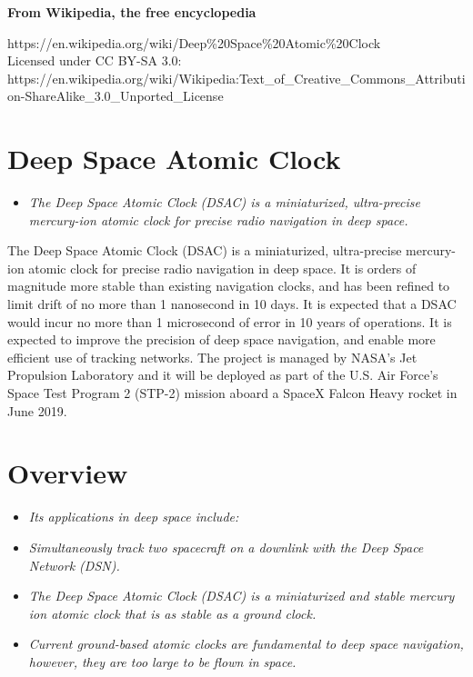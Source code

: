 \textbf{From Wikipedia, the free encyclopedia}

https://en.wikipedia.org/wiki/Deep\%20Space\%20Atomic\%20Clock\\
Licensed under CC BY-SA 3.0:\\
https://en.wikipedia.org/wiki/Wikipedia:Text\_of\_Creative\_Commons\_Attribution-ShareAlike\_3.0\_Unported\_License

\section{Deep Space Atomic Clock}\label{deep-space-atomic-clock}

\begin{itemize}
\item
  \emph{The Deep Space Atomic Clock (DSAC) is a miniaturized,
  ultra-precise mercury-ion atomic clock for precise radio navigation in
  deep space.}
\end{itemize}

The Deep Space Atomic Clock (DSAC) is a miniaturized, ultra-precise
mercury-ion atomic clock for precise radio navigation in deep space. It
is orders of magnitude more stable than existing navigation clocks, and
has been refined to limit drift of no more than 1 nanosecond in 10 days.
It is expected that a DSAC would incur no more than 1 microsecond of
error in 10 years of operations. It is expected to improve the precision
of deep space navigation, and enable more efficient use of tracking
networks. The project is managed by NASA's Jet Propulsion Laboratory and
it will be deployed as part of the U.S. Air Force's Space Test Program 2
(STP-2) mission aboard a SpaceX Falcon Heavy rocket in June 2019.

\section{Overview}\label{overview}

\begin{itemize}
\item
  \emph{Its applications in deep space include:}
\item
  \emph{Simultaneously track two spacecraft on a downlink with the Deep
  Space Network (DSN).}
\item
  \emph{The Deep Space Atomic Clock (DSAC) is a miniaturized and stable
  mercury ion atomic clock that is as stable as a ground clock.}
\item
  \emph{Current ground-based atomic clocks are fundamental to deep space
  navigation, however, they are too large to be flown in space.}
\end{itemize}

